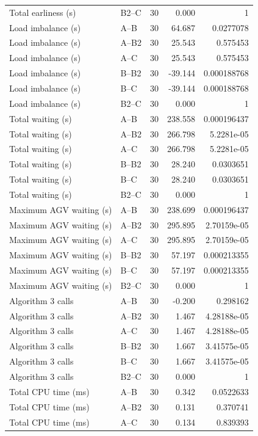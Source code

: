 \begin{table}[t]
\begin{tabular}{llrrr}
Total earliness (s) & B2--C & 30 & 0.000 & 1 \\
Load imbalance (s) & A--B & 30 & 64.687 & 0.0277078 \\
Load imbalance (s) & A--B2 & 30 & 25.543 & 0.575453 \\
Load imbalance (s) & A--C & 30 & 25.543 & 0.575453 \\
Load imbalance (s) & B--B2 & 30 & -39.144 & 0.000188768 \\
Load imbalance (s) & B--C & 30 & -39.144 & 0.000188768 \\
Load imbalance (s) & B2--C & 30 & 0.000 & 1 \\
Total waiting (s) & A--B & 30 & 238.558 & 0.000196437 \\
Total waiting (s) & A--B2 & 30 & 266.798 & 5.2281e-05 \\
Total waiting (s) & A--C & 30 & 266.798 & 5.2281e-05 \\
Total waiting (s) & B--B2 & 30 & 28.240 & 0.0303651 \\
Total waiting (s) & B--C & 30 & 28.240 & 0.0303651 \\
Total waiting (s) & B2--C & 30 & 0.000 & 1 \\
Maximum AGV waiting (s) & A--B & 30 & 238.699 & 0.000196437 \\
Maximum AGV waiting (s) & A--B2 & 30 & 295.895 & 2.70159e-05 \\
Maximum AGV waiting (s) & A--C & 30 & 295.895 & 2.70159e-05 \\
Maximum AGV waiting (s) & B--B2 & 30 & 57.197 & 0.000213355 \\
Maximum AGV waiting (s) & B--C & 30 & 57.197 & 0.000213355 \\
Maximum AGV waiting (s) & B2--C & 30 & 0.000 & 1 \\
Algorithm 3 calls & A--B & 30 & -0.200 & 0.298162 \\
Algorithm 3 calls & A--B2 & 30 & 1.467 & 4.28188e-05 \\
Algorithm 3 calls & A--C & 30 & 1.467 & 4.28188e-05 \\
Algorithm 3 calls & B--B2 & 30 & 1.667 & 3.41575e-05 \\
Algorithm 3 calls & B--C & 30 & 1.667 & 3.41575e-05 \\
Algorithm 3 calls & B2--C & 30 & 0.000 & 1 \\
Total CPU time (ms) & A--B & 30 & 0.342 & 0.0522633 \\
Total CPU time (ms) & A--B2 & 30 & 0.131 & 0.370741 \\
Total CPU time (ms) & A--C & 30 & 0.134 & 0.839393 \\

\end{tabular}
\end{table}
